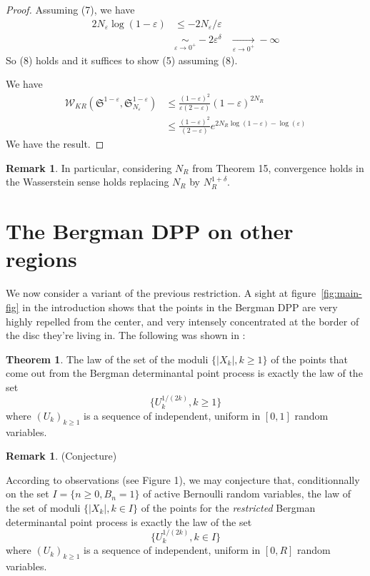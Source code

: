 \documentclass[11pt]{article}
\theoremstyle{plain}
\theoremstyle{definition}
\newtheorem{theorem}[definition]{Theorem}
\newtheorem{remark}[definition]{Remark}
\begin{document}
\begin{proof}

Assuming (7), we have
\begin{align*}
    2N_\varepsilon \log(1-\varepsilon) &\leqslant - 2N_\varepsilon / \varepsilon \\
                                       &\underset{\varepsilon \to 0^+}{\sim} - 2 \varepsilon^\delta
                                       &\xrightarrow[\varepsilon \to 0^+]{} - \infty 
\end{align*}
So (8) holds and it suffices to show (5) assuming (8).

We have
\begin{align*}
    \mathcal{W}_{KR}(\mathfrak{S}^{1-\varepsilon}, \mathfrak{S}_{N_\varepsilon }^{1-\varepsilon}) 
    &\leqslant \frac{(1-\varepsilon)^2}{\varepsilon(2-\varepsilon)} (1-\varepsilon)^{2 N_R} \\
    &\leqslant \frac{(1-\varepsilon)^2}{(2-\varepsilon)} e^{2 N_R \log(1-\varepsilon) - \log(\varepsilon)}
\end{align*}
We have the result.
\end{proof}

\begin{remark} In particular, considering $N_R$ from Theorem 15, convergence holds in the Wasserstein sense holds replacing $ N_R$ by $ N_R^{1+\delta} $.
\end{remark}

\section{The Bergman DPP on other regions}

We now consider a variant of the previous restriction. A sight at figure~\ref{fig:main-fig} in the introduction shows that the points in the Bergman DPP are very highly repelled from the center, and very intensely concentrated at the border of the disc they're living in. The following was shown in \cite{ZerosGaussianPowerSeries} :

\begin{theorem} The law of the set of the moduli $\{|X_k|, k \ge 1\}$ of the points that come out from the Bergman determinantal point process is exactly the law of the set
\[
\{U_k^{1/(2k)}, k \ge 1\}
\]
where $(U_k)_{k \ge 1}$ is a sequence of independent, uniform in $[0,1]$ random variables.
\end{theorem}

\begin{remark} (Conjecture)

According to observations (see Figure 1), we may conjecture that, conditionnally on the set $I = \{n \ge 0, B_n = 1\}$ of active Bernoulli random variables, the law of the set of moduli $\{|X_k|, k \in I\}$ of the points for the \textit{restricted} Bergman determinantal point process is exactly the law of the set
\[
\{U_k^{1/(2k)}, k \in I\}
\]
where $(U_k)_{k \ge 1}$ is a sequence of independent, uniform in $[0, R]$ random variables.
\end{remark}
\end{document}
